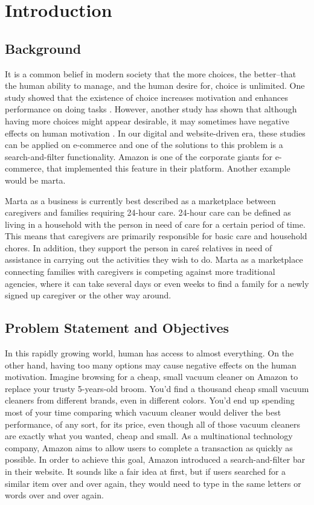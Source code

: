 \newpage
\section{Introduction}

\subsection{Background}

It is a common belief in modern society that the more choices, the better--that the human ability to manage, and the human desire for, choice is unlimited. One study showed that the existence of choice increases motivation and enhances performance on doing tasks \cite{zuckerman1978importance}. However, another study has shown that although having more choices might appear desirable, it may sometimes have negative effects on human motivation \cite{iyengar2000choice}. In our digital and website-driven era, these studies can be applied on e-commerce and one of the solutions to this problem is a search-and-filter functionality. Amazon is one of the corporate giants for e-commerce, that implemented this feature in their platform. Another example would be marta. 

Marta as a business is currently best described as a marketplace between caregivers and families requiring 24-hour care. 24-hour care can be defined as living in a household with the person in need of care for a certain period of time. This means that caregivers are primarily responsible for basic care and household chores. In addition, they support the person in care\'s relatives in need of assistance in carrying out the activities they wish to do. Marta as a marketplace connecting families with caregivers is competing against more traditional agencies, where it can take several days or even weeks to find a family for a newly signed up caregiver or the other way around.

\subsection{Problem Statement and Objectives}

In this rapidly growing world, human has access to almost everything. On the other hand, having too many options may cause negative effects on the human motivation. Imagine browsing for a cheap, small vacuum cleaner on Amazon to replace your trusty 5-years-old broom. You'd find a thousand cheap small vacuum cleaners from different brands, even in different colors. You'd end up spending most of your time comparing which vacuum cleaner would deliver the best performance, of any sort, for its price, even though all of those vacuum cleaners are exactly what you wanted, cheap and small. As a multinational technology company, Amazon aims to allow users to complete a transaction as quickly as possible. In order to achieve this goal, Amazon introduced a search-and-filter bar in their website. It sounds like a fair idea at first, but if users searched for a similar item over and over again, they would need to type in the same letters or words over and over again.

